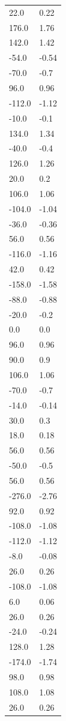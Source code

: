 \begin{longtable}{ll}
22.0 & 0.22 \\
176.0 & 1.76 \\
142.0 & 1.42 \\
-54.0 & -0.54 \\
-70.0 & -0.7 \\
96.0 & 0.96 \\
-112.0 & -1.12 \\
-10.0 & -0.1 \\
134.0 & 1.34 \\
-40.0 & -0.4 \\
126.0 & 1.26 \\
20.0 & 0.2 \\
106.0 & 1.06 \\
-104.0 & -1.04 \\
-36.0 & -0.36 \\
56.0 & 0.56 \\
-116.0 & -1.16 \\
42.0 & 0.42 \\
-158.0 & -1.58 \\
-88.0 & -0.88 \\
-20.0 & -0.2 \\
0.0 & 0.0 \\
96.0 & 0.96 \\
90.0 & 0.9 \\
106.0 & 1.06 \\
-70.0 & -0.7 \\
-14.0 & -0.14 \\
30.0 & 0.3 \\
18.0 & 0.18 \\
56.0 & 0.56 \\
-50.0 & -0.5 \\
56.0 & 0.56 \\
-276.0 & -2.76 \\
92.0 & 0.92 \\
-108.0 & -1.08 \\
-112.0 & -1.12 \\
-8.0 & -0.08 \\
26.0 & 0.26 \\
-108.0 & -1.08 \\
6.0 & 0.06 \\
26.0 & 0.26 \\
-24.0 & -0.24 \\
128.0 & 1.28 \\
-174.0 & -1.74 \\
98.0 & 0.98 \\
108.0 & 1.08 \\
26.0 & 0.26 \\

\end{longtable}
